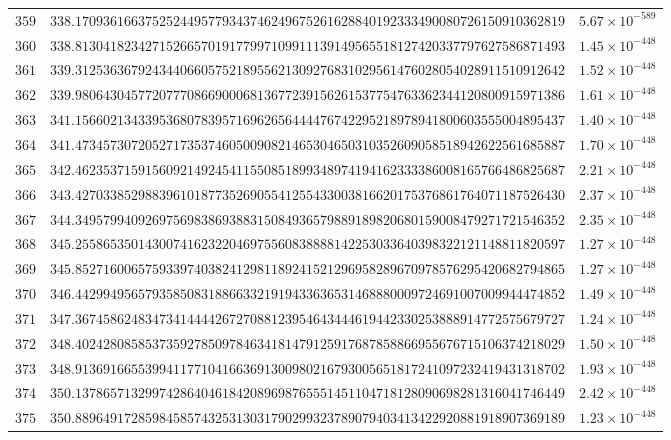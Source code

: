 \documentclass[12pt,reqno]{amsart}
\theoremstyle{remark}
\begin{document}
\begin{longtable}{clc}
$359$ & $338.1709361663752524495779343746249675261628840192333490080726150910362819$ & $5.67\times 10^{-589}$ \\
$360$ & $338.8130418234271526657019177997109911139149565518127420337797627586871493$ & $1.45\times 10^{-448}$ \\
$361$ & $339.3125363679243440660575218955621309276831029561476028054028911510912642$ & $1.52\times 10^{-448}$ \\
$362$ & $339.9806430457720777086690006813677239156261537754763362344120800915971386$ & $1.61\times 10^{-448}$ \\
$363$ & $341.1566021343395368078395716962656444476742295218978941800603555004895437$ & $1.40\times 10^{-448}$ \\
$364$ & $341.4734573072052717353746050090821465304650310352609058518942622561685887$ & $1.70\times 10^{-448}$ \\
$365$ & $342.4623537159156092149245411550851899348974194162333386008165766486825687$ & $2.21\times 10^{-448}$ \\
$366$ & $343.4270338529883961018773526905541255433003816620175376861764071187526430$ & $2.37\times 10^{-448}$ \\
$367$ & $344.3495799409269756983869388315084936579889189820680159008479271721546352$ & $2.35\times 10^{-448}$ \\
$368$ & $345.2558653501430074162322046975560838888142253033640398322121148811820597$ & $1.27\times 10^{-448}$ \\
$369$ & $345.8527160065759339740382412981189241521296958289670978576295420682794865$ & $1.27\times 10^{-448}$ \\
$370$ & $346.4429949565793585083188663321919433636531468880009724691007009944474852$ & $1.49\times 10^{-448}$ \\
$371$ & $347.3674586248347341444426727088123954643444619442330253888914772575679727$ & $1.24\times 10^{-448}$ \\
$372$ & $348.4024280858537359278509784634181479125917687858866955676715106374218029$ & $1.50\times 10^{-448}$ \\
$373$ & $348.9136916655399411771041663691300980216793005651817241097232419431318702$ & $1.93\times 10^{-448}$ \\
$374$ & $350.1378657132997428640461842089698765551451104718128090698281316041746449$ & $2.42\times 10^{-448}$ \\
$375$ & $350.8896491728598458574325313031790299323789079403413422920881918907369189$ & $1.23\times 10^{-448}$ \\

\end{longtable}
\end{document}
